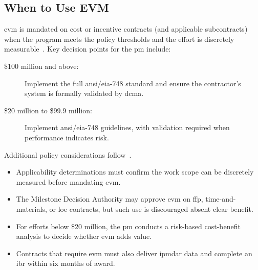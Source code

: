 \documentclass[../main.tex]{subfiles}
\begin{document}
\subsection{When to Use EVM}
\ac{evm} is mandated on cost or incentive contracts (and applicable subcontracts) when the program meets the policy thresholds and the effort is discretely measurable~\autocite{edo-3-6-1-evm-intro-2025,DFARS}. Key decision points for the \ac{pm} include:
\begin{description}
  \item[\$100 million and above:] Implement the full \ac{ansi}/\ac{eia}-748 standard and ensure the contractor's system is formally validated by \ac{dcma}.
  \item[\$20 million to \$99.9 million:] Implement \ac{ansi}/\ac{eia}-748 guidelines, with validation required when performance indicates risk.
\end{description}
Additional policy considerations follow~\autocite{edo-3-6-1-evm-intro-2025,DoDI5000-85}.
\begin{itemize}
  \item Applicability determinations must confirm the work scope can be discretely measured before mandating \ac{evm}.
  \item The Milestone Decision Authority may approve \ac{evm} on \ac{ffp}, time-and-materials, or \ac{loe} contracts, but such use is discouraged absent clear benefit.
  \item For efforts below \$20 million, the \ac{pm} conducts a risk-based cost-benefit analysis to decide whether \ac{evm} adds value.
  \item Contracts that require \ac{evm} must also deliver \ac{ipmdar} data and complete an \ac{ibr} within six months of award.
\end{itemize}
\end{document}
